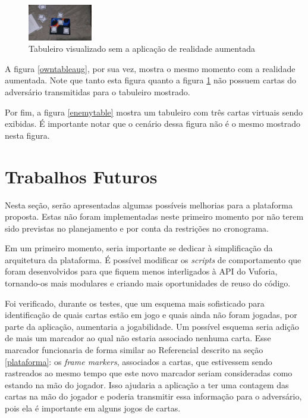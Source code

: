 \documentclass[conference]{IEEEtran}
\begin{document}
\begin{figure}[b]
	\caption{Tabuleiro visualizado sem a aplicação de realidade aumentada}
	\label{owntablereal}
	\centering
	\includegraphics[width=0.25\textwidth]{owntablereal}
\end{figure}

A figura \ref{owntableaug}, por sua vez, mostra o mesmo momento com a realidade 
aumentada. Note que tanto esta figura quanto a figura \ref{owntablereal} não 
possuem cartas do adversário transmitidas para o tabuleiro mostrado.

Por fim, a figura \ref{enemytable} mostra um tabuleiro com três cartas virtuais 
sendo exibidas. É importante notar que o cenário dessa figura não é o mesmo 
mostrado nesta figura.

\section{Trabalhos Futuros}
\label{trab_fut}
Nesta seção, serão apresentadas algumas possíveis melhorias para a plataforma
proposta. Estas não foram implementadas neste primeiro momento por não terem 
sido previstas no planejamento e por conta da restrições no cronograma.

Em um primeiro momento, seria importante se dedicar à simplificação da 
arquitetura da plataforma. É possível modificar os \textit{scripts} de 
comportamento que foram desenvolvidos para que fiquem menos interligados à API 
do Vuforia, tornando-os mais modulares e criando mais oportunidades de reuso do 
código.

Foi verificado, durante os testes, que um esquema mais sofisticado para 
identificação de quais cartas estão em jogo e quais ainda não foram jogadas, por 
parte da aplicação, aumentaria a jogabilidade. Um possível esquema seria adição 
de mais um marcador ao qual não estaria associado nenhuma carta. Esse marcador 
funcionaria de forma similar ao Referencial descrito na seção \ref{plataforma}: 
os \textit{frame markers}, associados a cartas, que estivessem sendo rastreados 
ao mesmo tempo que este novo marcador seriam consideradas como estando na 
mão do jogador. Isso ajudaria a aplicação a ter uma contagem das cartas na mão 
do jogador e poderia transmitir essa informação para o adversário, pois ela é 
importante em alguns jogos de cartas.
\end{document}
